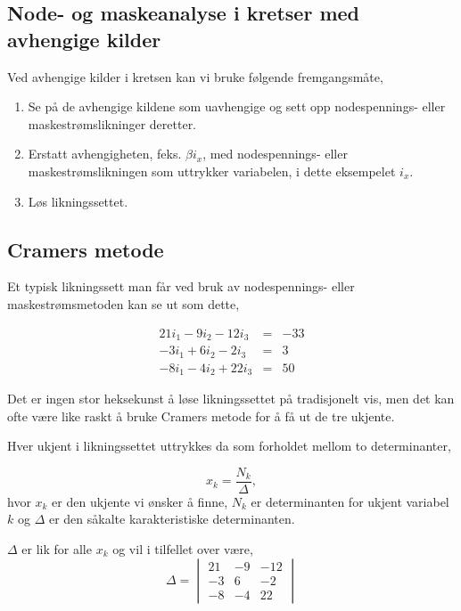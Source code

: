 \documentclass[norsk, a4paper, 12pt, twoside, titlepage]{article}
\begin{document}
\subsection{Node- og maskeanalyse i kretser med avhengige kilder}
Ved avhengige kilder i kretsen kan vi bruke følgende fremgangsmåte,
\begin{enumerate}
\item Se på de avhengige kildene som uavhengige og sett opp
  nodespennings- eller maskestrømslikninger deretter.
\item Erstatt avhengigheten, feks. $\beta i_{x}$, med nodespennings-
  eller maskestrømslikningen som uttrykker variabelen, i dette
  eksempelet $i_{x}$.
\item Løs likningssettet.
\end{enumerate}

\subsection{Cramers metode}
Et typisk likningssett man får ved bruk av nodespennings- eller
maskestrømsmetoden kan se ut som dette,

\begin{eqnarray}
21i_{1} - 9i_{2} - 12i_{3} & = & -33 \\
-3i_{1} + 6i_{2} - 2i_{3} & = & 3 \\
-8i_{1} - 4i_{2} + 22i_{3} & = & 50
\end{eqnarray}

Det er ingen stor heksekunst å løse likningssettet på tradisjonelt
vis, men det kan ofte være like raskt å bruke Cramers metode for å få
ut de tre ukjente.

Hver ukjent i likningssettet uttrykkes da som forholdet mellom to
determinanter,

\begin{equation}
x_{k} = \frac{N_{k}}{\Delta},
\end{equation}
hvor $x_{k}$ er den ukjente vi ønsker å finne, $N_{k}$ er
determinanten for ukjent variabel $k$ og $\Delta$ er den såkalte
karakteristiske determinanten.

$\Delta$ er lik for alle $x_{k}$ og vil i tilfellet over være,
\begin{equation}
\Delta = \begin{vmatrix}21 & -9 & -12 \\ -3 & 6 & -2 \\ -8 & -4 &
    22\end{vmatrix}
\end{equation}
\end{document}
